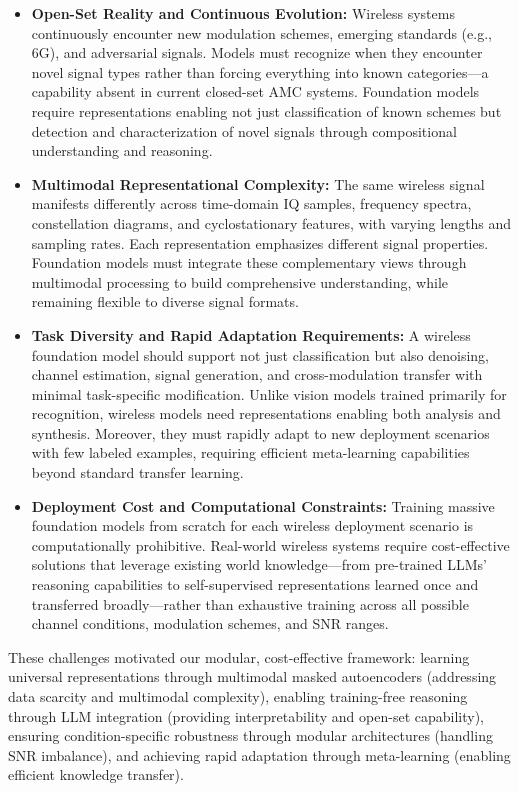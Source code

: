 \begin{itemize}
    \item \textbf{Open-Set Reality and Continuous Evolution:} Wireless systems continuously encounter new modulation schemes, emerging standards (e.g., 6G), and adversarial signals\cite{}. Models must recognize when they encounter novel signal types rather than forcing everything into known categories—a capability absent in current closed-set AMC systems\cite{}. Foundation models require representations enabling not just classification of known schemes but detection and characterization of novel signals through compositional understanding and reasoning\cite{}.
    
    \item \textbf{Multimodal Representational Complexity:} The same wireless signal manifests differently across time-domain IQ samples, frequency spectra, constellation diagrams, and cyclostationary features\cite{}, with varying lengths and sampling rates. Each representation emphasizes different signal properties\cite{}. Foundation models must integrate these complementary views through multimodal processing\cite{} to build comprehensive understanding, while remaining flexible to diverse signal formats.
    
    \item \textbf{Task Diversity and Rapid Adaptation Requirements:} A wireless foundation model should support not just classification but also denoising, channel estimation, signal generation, and cross-modulation transfer\cite{} with minimal task-specific modification. Unlike vision models trained primarily for recognition\cite{}, wireless models need representations enabling both analysis and synthesis. Moreover, they must rapidly adapt to new deployment scenarios with few labeled examples, requiring efficient meta-learning capabilities\cite{} beyond standard transfer learning\cite{}.
    
    \item \textbf{Deployment Cost and Computational Constraints:} Training massive foundation models from scratch for each wireless deployment scenario is computationally prohibitive\cite{}. Real-world wireless systems require cost-effective solutions that leverage existing world knowledge—from pre-trained LLMs' reasoning capabilities to self-supervised representations learned once and transferred broadly—rather than exhaustive training across all possible channel conditions, modulation schemes, and SNR ranges.
\end{itemize}

These challenges motivated our modular, cost-effective framework: learning universal representations through multimodal masked autoencoders (addressing data scarcity and multimodal complexity), enabling training-free reasoning through LLM integration (providing interpretability and open-set capability), ensuring condition-specific robustness through modular architectures (handling SNR imbalance), and achieving rapid adaptation through meta-learning (enabling efficient knowledge transfer).

